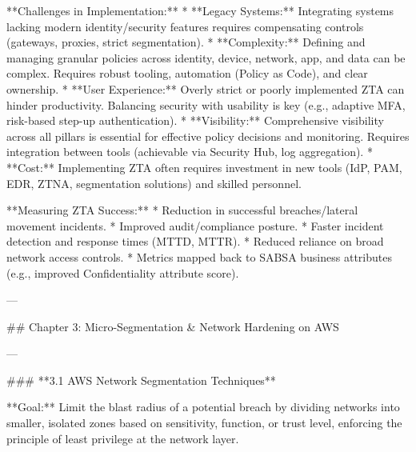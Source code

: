 \documentclass{article}
\begin{document}
**Challenges in Implementation:**
* **Legacy Systems:** Integrating systems lacking modern identity/security features requires compensating controls (gateways, proxies, strict segmentation).
* **Complexity:** Defining and managing granular policies across identity, device, network, app, and data can be complex. Requires robust tooling, automation (Policy as Code), and clear ownership.
* **User Experience:** Overly strict or poorly implemented ZTA can hinder productivity. Balancing security with usability is key (e.g., adaptive MFA, risk-based step-up authentication).
* **Visibility:** Comprehensive visibility across all pillars is essential for effective policy decisions and monitoring. Requires integration between tools (achievable via Security Hub, log aggregation).
* **Cost:** Implementing ZTA often requires investment in new tools (IdP, PAM, EDR, ZTNA, segmentation solutions) and skilled personnel.

**Measuring ZTA Success:**
* Reduction in successful breaches/lateral movement incidents.
* Improved audit/compliance posture.
* Faster incident detection and response times (MTTD, MTTR).
* Reduced reliance on broad network access controls.
* Metrics mapped back to SABSA business attributes (e.g., improved Confidentiality attribute score).

---

## Chapter 3: Micro-Segmentation & Network Hardening on AWS

---

### **3.1 AWS Network Segmentation Techniques**

**Goal:** Limit the blast radius of a potential breach by dividing networks into smaller, isolated zones based on sensitivity, function, or trust level, enforcing the principle of least privilege at the network layer.
\end{document}
